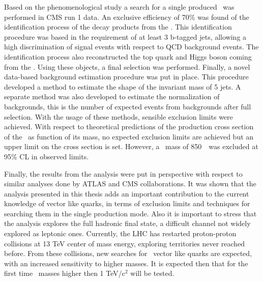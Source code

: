 Based on the phenomenological study a search for a single produced \Tp~was performed in CMS run 1 data. An exclusive efficiency of 70\% was found of the identification process of the decay products from the \Tp. This identification procedure was based in the requirement of at least 3 b-tagged jets, allowing a high discrimination of signal events with respect to QCD background events. The identification process also reconstructed the top quark and Higgs boson coming from the \Tp. Using these objects, a final selection was performed. Finally, a novel data-based background estimation procedure was put in place. This procedure developed a method to estimate the shape of the invariant mass of 5 jets. A separate method was also developed to estimate the normalization of backgrounds, this is the number of expected events from backgrounds after full selection. With the usage of these methods, sensible exclusion limits were achieved. With respect to theoretical predictions of the production cross section of the \Tp~as function of its mass, no expected exclusion limits are achieved but an upper limit on the cross section is set. However, a \Tp~mass of 850~\GeVcc~was excluded at 95\% CL in observed limits.

Finally, the results from the analysis were put in perspective with respect to similar analyses done by ATLAS and CMS collaborations. It was shown that the analysis presented in this thesis adds an important contribution to the current knowledge of vector like quarks, in terms of exclusion limits and techniques for searching them in the single production mode. Also it is important to stress that the analysis explores the full hadronic final state, a difficult channel not widely explored as leptonic ones. Currently, the LHC has restarted proton-proton collisions at 13 TeV center of mass energy, exploring territories never reached before. From these collisions, new searches for \Tp~vector like quarks are expected, with an increased sensitivity to higher masses. It is expected then that for the first time \Tp~masses higher then 1 TeV/$\text{c}^{2}$ will be tested.